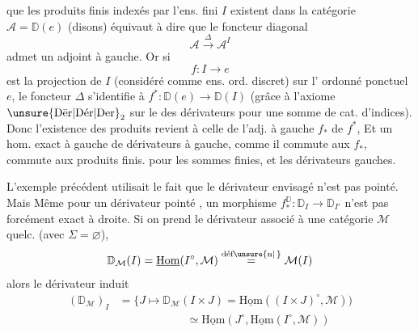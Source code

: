   que les produits finis indexés par l'ens. fini $I$ existent dans la catégorie $\mathcal A=\mathbb D(e)$ (disons) équivaut à dire que le foncteur diagonal
\[
\mathcal A\xrightarrow{\Delta}\mathcal A^I
\]
admet un adjoint à gauche. Or si
\[
f:I\longrightarrow e
\]
est la projection de $I$ (considéré comme ens. ord. discret) sur  l' ordonné ponctuel $e$, le foncteur $\Delta$ s'identifie à $f^*:\mathbb D(e)\longrightarrow\mathbb D(I)$ (grâce à l'axiome $\unsure{\mathrm{D\bar er}|\mathrm{D\acute er}|\mathrm{Der}}_2$ sur le  des dérivateurs pour une somme  de cat. d'indices).
Donc l'existence des produits revient à celle de l'adj. à gauche $f_*$ de $f^*$,  Et un hom. exact à gauche de dérivateurs à gauche, comme il commute aux $f_*$, commute aux produits finis.  pour les sommes finies, et les dérivateurs gauches.

L'exemple précédent utilisait le fait que le dérivateur envisagé n'est pas pointé. Mais Même pour un dérivateur pointé , un morphisme $f^{\mathbb D}_*:\mathbb D_I\longrightarrow\mathbb D_{I'}$ n'est pas forcément exact à droite. Si on prend le dérivateur associé à une catégorie $\mathcal M$ quelc. (avec $\Sigma=\varnothing$),
\[
\mathbb D_{\mathcal M}(I)=\underline{\mathrm{Hom}}(I^\circ,\mathcal M)\overset{\text{déf}\unsure{\text{n}|\,}}{=}\mathcal M(I)
\]
alors le dérivateur induit
\[
\begin{aligned}
(\mathbb D_{\mathcal M})_I&=\big\{J\longmapsto\mathbb D_{\mathcal M}(I\times J)=\underline{\mathrm{Hom}}((I\times J)^\circ,\mathcal M))\\
&\hspace{6em}\simeq\underline{\mathrm{Hom}}(J^\circ,\underline{\mathrm{Hom}}(I^\circ,\mathcal M))
\end{aligned}
\]
